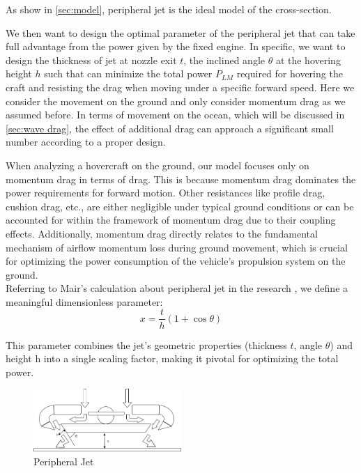 As show in \ref{sec:model}, peripheral jet is the ideal model of the cross-section. 

We then want to design the optimal parameter of the peripheral jet that can take full advantage from the power given by the fixed engine. In specific, we want to design the thickness of jet at nozzle exit $t$, the inclined angle $\theta$ at the hovering height $h$ such that can minimize the total power $P_{LM}$ required for hovering the craft and resisting the drag when moving under a specific forward speed. Here we consider the movement on the ground and only consider momentum drag as we assumed before. In terms of movement on the ocean, which will be discussed in \ref{sec:wave drag}, the effect of additional drag can approach a significant small number according to a proper design. 

When analyzing a hovercraft on the ground, our model focuses only on momentum drag in terms of drag. This is because momentum drag dominates the power requirements for forward motion. Other resistances like profile drag, cushion drag, etc., are either negligible under typical ground conditions or can be accounted for within the framework of momentum drag due to their coupling effects. Additionally, momentum drag directly relates to the fundamental mechanism of airflow momentum loss during ground movement, which is crucial for optimizing the power consumption of the vehicle's propulsion system on the ground.\\
Referring to Mair's calculation about peripheral jet in the research \cite{mair1964physical}, 
we define a meaningful dimensionless parameter:
\begin{equation}
    x = \frac{t}{h} (1 + \cos\theta) \label{eq:xdef}
\end{equation}

This parameter combines the jet's geometric properties (thickness $t$, angle $\theta$) and height h into a single scaling factor, making it pivotal for optimizing the total power.

\begin{figure}[H]
  \centering
  \includegraphics[width=0.5\textwidth]{images/PeripheralJet.jpg}
  \caption{Peripheral Jet}
  \label{fig:PeripheralJet2}
\end{figure}

